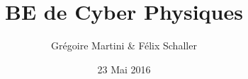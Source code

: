 \documentclass[a4paper,12pt]{article}
\title{BE de Cyber Physiques}
\author{Grégoire Martini \& Félix Schaller }
\date{23 Mai 2016}
\begin{document}
\maketitle

\bigskip
\bigskip
\bigskip
\tableofcontents
\newpage


\section{}

\subsection{}

\subparagraph{}
\end{document}
